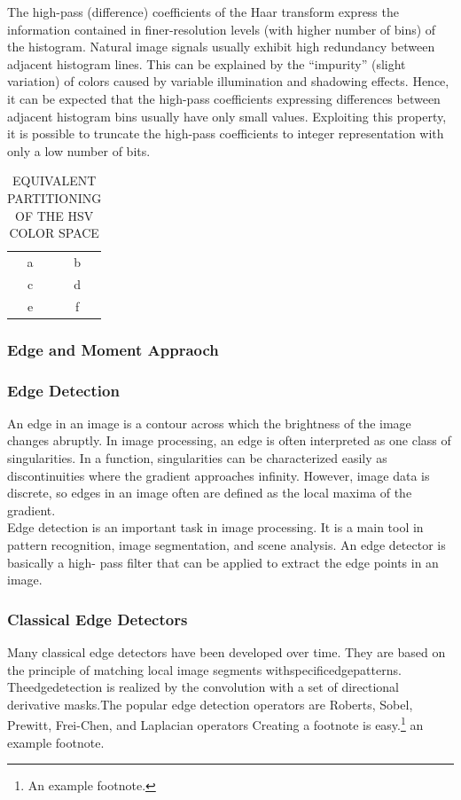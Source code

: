 The high-pass (difference) coefficients of the Haar transform
express the information contained in finer-resolution levels
(with higher number of bins) of the histogram. Natural image
signals usually exhibit high redundancy between adjacent
histogram lines. This can be explained by the ``impurity''
(slight variation) of colors caused by variable illumination and
shadowing effects. Hence, it can be expected that the high-pass
coefficients expressing differences between adjacent histogram
bins usually have only small values. Exploiting this property,
it is possible to truncate the high-pass coefficients to integer
representation with only a low number of bits.
\begin{table}
\centering
\begin{tabular}{|c|c|}
	
a &b \\
c &d  \\
e &f  \\
\end{tabular}
\label{tab:CSD}
\caption{EQUIVALENT PARTITIONING OF THE HSV COLOR SPACE}
\end{table}
%
\subsubsection {Edge and Moment Appraoch}

\subsubsection{Edge Detection}
An edge in an image is a contour across which the brightness of the image changes abruptly.
In image processing, an edge is often interpreted as one class of singularities. In a function,
singularities can be characterized easily as discontinuities where the gradient approaches
infinity. However, image data is discrete, so edges in an image often are defined as the
local maxima of the gradient.
\\
Edge detection is an important task in image processing. It is a main tool in pattern
recognition, image segmentation, and scene analysis. An edge detector is basically a high-
pass filter that can be applied to extract the edge points in an image.

\subsubsection{Classical Edge Detectors}
Many classical edge detectors have been developed over time. They are based on the
principle of matching local image segments withspecificedgepatterns. Theedgedetection
is realized by the convolution with a set of directional derivative masks.The popular edge detection operators are Roberts, Sobel, Prewitt, Frei-Chen, and Laplacian operators
Creating a footnote is easy.\footnote{An example footnote.}  	an example footnote.
